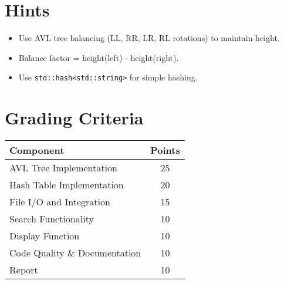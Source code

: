 \documentclass[11pt]{article}
\begin{document}
\section*{Hints}
\begin{itemize}
  \item Use AVL tree balancing (LL, RR, LR, RL rotations) to maintain height.
  \item Balance factor = height(left) - height(right).
  \item Use \texttt{std::hash<std::string>} for simple hashing.
\end{itemize}

\section*{Grading Criteria}

\begin{tabular}{|l|c|}
\hline
\textbf{Component} & \textbf{Points} \\
\hline
AVL Tree Implementation & 25 \\
Hash Table Implementation & 20 \\
File I/O and Integration & 15 \\
Search Functionality & 10 \\
Display Function & 10 \\
Code Quality \& Documentation & 10 \\
Report & 10 \\
\hline
\end{tabular}
\end{document}
